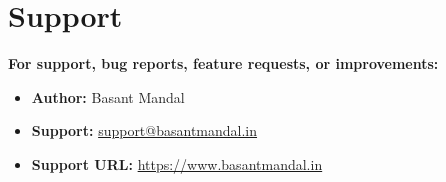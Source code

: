 \documentclass[11pt,a4paper]{article}
\begin{document}
\section{Support}

\textbf{For support, bug reports, feature requests, or improvements:}

\begin{itemize}
  \item \textbf{Author:} Basant Mandal
  \item \textbf{Support:} \href{mailto:support@basantmandal.in}{support@basantmandal.in}
  \item \textbf{Support URL:} \href{https://www.basantmandal.in}{https://www.basantmandal.in}
\end{itemize}
\end{document}

